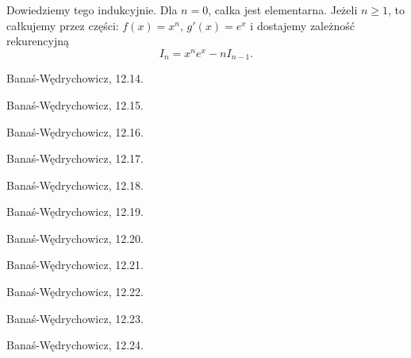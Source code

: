 \begin{solution}
    Dowiedziemy tego indukcyjnie.
    Dla $n = 0$, całka jest elementarna.
    Jeżeli $n \ge 1$, to całkujemy przez części: $f(x) = x^n$, $g'(x) = e^x$ i dostajemy zależność rekurencyjną
    \begin{equation}
        I_n = x^n e^x - nI_{n-1}.
    \end{equation}
\end{solution}

\begin{integral}
Banaś-Wędrychowicz, 12.14.
\end{integral}

\begin{integral}
Banaś-Wędrychowicz, 12.15.
\end{integral}

\begin{integral}
Banaś-Wędrychowicz, 12.16.
\end{integral}

\begin{integral}
Banaś-Wędrychowicz, 12.17.
\end{integral}

\begin{integral}
Banaś-Wędrychowicz, 12.18.
\end{integral}

\begin{integral}
Banaś-Wędrychowicz, 12.19.
\end{integral}

\begin{integral}
Banaś-Wędrychowicz, 12.20.
\end{integral}

\begin{integral}
Banaś-Wędrychowicz, 12.21.
\end{integral}

\begin{integral}
Banaś-Wędrychowicz, 12.22.
\end{integral}

\begin{integral}
Banaś-Wędrychowicz, 12.23.
\end{integral}

\begin{integral}
Banaś-Wędrychowicz, 12.24.
\end{integral}

